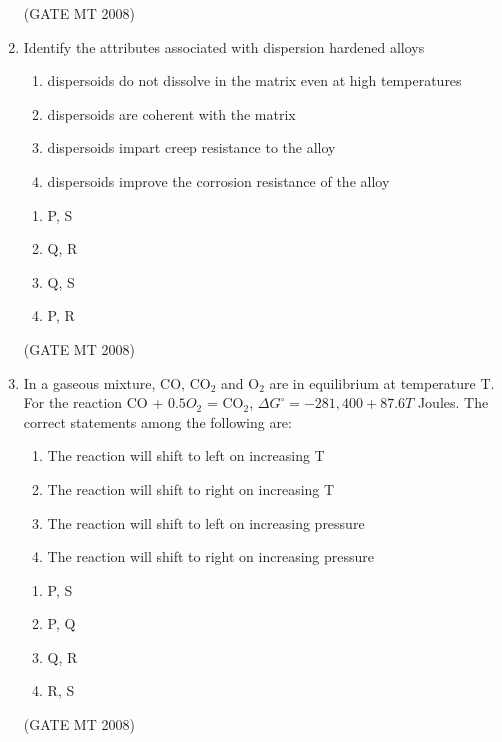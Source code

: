 \documentclass[11pt, letterpaper]{article}
\theoremstyle{remark}
\begin{document}
\begin{enumerate}[label=Q.\arabic*]
\hfill(GATE MT 2008)
\item Identify the attributes associated with dispersion hardened alloys
        \begin{enumerate}[label=(\MakeUppercase{\alph*}), start= 16]
            \item dispersoids do not dissolve in the matrix even at high temperatures
            \item dispersoids are coherent with the matrix
            \item dispersoids impart creep resistance to the alloy
            \item dispersoids improve the corrosion resistance of the alloy
        \end{enumerate}
    \begin{multicols}{2}
        \begin{enumerate}[label=(\MakeUppercase{\alph*})]
            \item P, S
            \item Q, R
            \item Q, S
            \item P, R
        \end{enumerate}
    \end{multicols}
\hfill(GATE MT 2008)
    \item In a gaseous mixture, CO, CO$_2$ and O$_2$ are in equilibrium at temperature T. 
    For the reaction CO + $0.5O$$_2$ = CO$_2$, 
    $\Delta G^\circ = -281,400 + 87.6T$ Joules. 
    The correct statements among the following are:

        \begin{enumerate}[label=(\MakeUppercase{\alph*}), start= 16]
            \item The reaction will shift to left on increasing T
            \item The reaction will shift to right on increasing T
            \item The reaction will shift to left on increasing pressure
            \item The reaction will shift to right on increasing pressure
        \end{enumerate}

    \begin{multicols}{2}
        \begin{enumerate}[label=(\MakeUppercase{\alph*})]
            \item P, S
            \item P, Q
            \item Q, R
            \item R, S
        \end{enumerate}
    \end{multicols}
\hfill(GATE MT 2008)


\end{enumerate}
\end{document}
